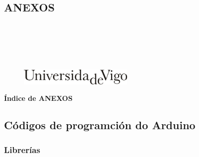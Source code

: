 \documentclass[11pt,twoside]{book}
\begin{document}
\begin{center}
\begin{normalsize}
\begin{center}
\part{\bf{ANEXOS}}\thispagestyle{empty}
\end{center}
\end{normalsize}
\ \\
\ \\
\ \\
\ \\

\begin{center}
\begin{figure}[htbp]
\begin{center}
\includegraphics[angle=0, height=0.8cm]{images/UVIGOLogo.png}
\end{center}
\end{figure}
\end{center}

\end{center}

\cleardoublepage


\pagestyle{fancy}
\startcontents[parts]
\cleardoublepage

\begin{center}{\large \bf Índice de ANEXOS}\end{center}

{\hypersetup{hidelinks}}

\cleardoublepage
\chapter{Códigos de programción do Arduino}
\section{Librerías}
\end{document}
